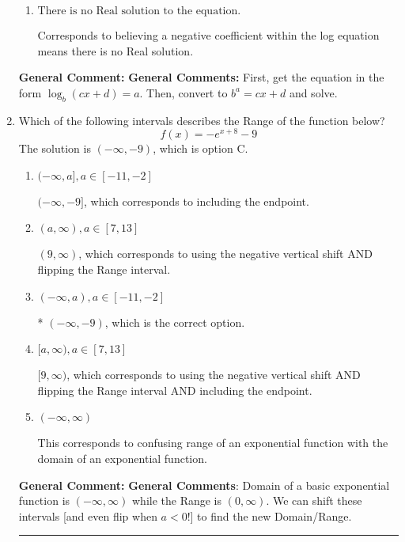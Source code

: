 \documentclass{extbook}[14pt]
\newcommand{\litem}[1]{\item #1

\rule{\textwidth}{0.4pt}}
\begin{document}
\begin{enumerate}
{\begin{enumerate}[label=\Alph*.]
$x = 131.500$, which corresponds to reversing the base and exponent when converting and reversing the value with $x$.
\item \( \text{There is no Real solution to the equation.} \)

Corresponds to believing a negative coefficient within the log equation means there is no Real solution.
\end{enumerate}

\textbf{General Comment:} \textbf{General Comments:} First, get the equation in the form $\log_b{(cx+d)} = a$. Then, convert to $b^a = cx+d$ and solve.
}
\litem{
Which of the following intervals describes the Range of the function below?
\[ f(x) = -e^{x+8}-9 \]The solution is \( (-\infty, -9) \), which is option C.\begin{enumerate}[label=\Alph*.]
\item \( (-\infty, a], a \in [-11, -2] \)

$(-\infty, -9]$, which corresponds to including the endpoint.
\item \( (a, \infty), a \in [7, 13] \)

$(9, \infty)$, which corresponds to using the negative vertical shift AND flipping the Range interval.
\item \( (-\infty, a), a \in [-11, -2] \)

* $(-\infty, -9)$, which is the correct option.
\item \( [a, \infty), a \in [7, 13] \)

$[9, \infty)$, which corresponds to using the negative vertical shift AND flipping the Range interval AND including the endpoint.
\item \( (-\infty, \infty) \)

This corresponds to confusing range of an exponential function with the domain of an exponential function.
\end{enumerate}

\textbf{General Comment:} \textbf{General Comments}: Domain of a basic exponential function is $(-\infty, \infty)$ while the Range is $(0, \infty)$. We can shift these intervals [and even flip when $a<0$!] to find the new Domain/Range.
}
\end{enumerate}
\end{document}
